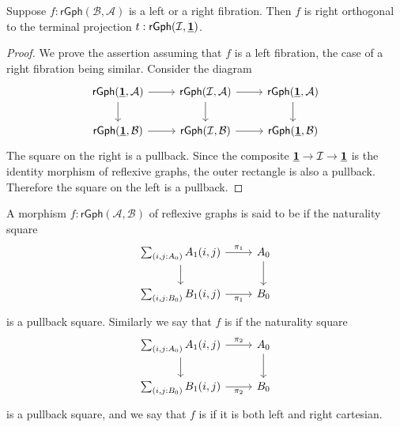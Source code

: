 \begin{lem}\label{lem:leftfib_Inull}
Suppose $f:\mathsf{rGph}(\mathcal{B},\mathcal{A})$ is a left or a right fibration. Then $f$ is right orthogonal to the terminal projection $t:\mathsf{rGph}(\mathcal{I},\underline{\mathbf{1}})$.
\end{lem}

\begin{proof}
We prove the assertion assuming that $f$ is a left fibration, the case of a right fibration being similar. Consider the diagram
\begin{equation*}
\begin{tikzcd}
\mathsf{rGph}(\unit,\mathcal{A}) \arrow[d] \arrow[r] & \mathsf{rGph}(\mathcal{I},\mathcal{A}) \arrow[r] \arrow[d] & \mathsf{rGph}(\unit,\mathcal{A}) \arrow[d] \\
\mathsf{rGph}(\unit,\mathcal{B}) \arrow[r] & \mathsf{rGph}(\mathcal{I},\mathcal{B}) \arrow[r] & \mathsf{rGph}(\unit,\mathcal{B})
\end{tikzcd}
\end{equation*}
The square on the right is a pullback. Since the composite $\underline{\mathbf{1}} \to \mathcal{I}\to \underline{\mathbf{1}}$ is the identity morphism of reflexive graphs, the outer rectangle is also a pullback. Therefore the square on the left is a pullback.
\end{proof}

\begin{defn}
A morphism $f:\mathsf{rGph}(\mathcal{A},\mathcal{B})$ of reflexive graphs is said to be  if the naturality square
\begin{equation*}
\begin{tikzcd}
\sm{i,j:\pts{A}}\edg{A}(i,j) \arrow[d] \arrow[r,"\pi_1"] & \pts{A} \arrow[d] \\
\sm{i,j:\pts{B}}\edg{B}(i,j) \arrow[r,swap,"\pi_1"] & \pts{B}
\end{tikzcd}
\end{equation*}
is a pullback square. Similarly we say that $f$ is  if the naturality square
\begin{equation*}
\begin{tikzcd}
\sm{i,j:\pts{A}}\edg{A}(i,j) \arrow[d] \arrow[r,"\pi_2"] & \pts{A} \arrow[d] \\
\sm{i,j:\pts{B}}\edg{B}(i,j) \arrow[r,swap,"\pi_2"] & \pts{B}
\end{tikzcd}
\end{equation*}
is a pullback square, and we say that $f$ is  if it is both left and right cartesian.
\end{defn}

